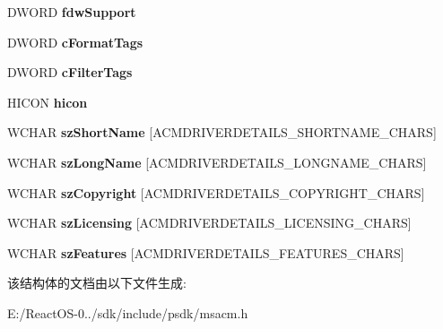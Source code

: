 \begin{DoxyCompactItemize}
\mbox{\label{struct___a_c_m_d_r_i_v_e_r_d_e_t_a_i_l_s_w_aeed15212fc48641aa25762755abd782d}} 
D\+W\+O\+RD {\bfseries fdw\+Support}
\item 
\mbox{\label{struct___a_c_m_d_r_i_v_e_r_d_e_t_a_i_l_s_w_aecf35e3010b66738f0c3a08c623d84c2}} 
D\+W\+O\+RD {\bfseries c\+Format\+Tags}
\item 
\mbox{\label{struct___a_c_m_d_r_i_v_e_r_d_e_t_a_i_l_s_w_a01c15d05af093f06e7635a5e24933dd8}} 
D\+W\+O\+RD {\bfseries c\+Filter\+Tags}
\item 
\mbox{\label{struct___a_c_m_d_r_i_v_e_r_d_e_t_a_i_l_s_w_a8a86ebe3bdfe40eef7809e89ca58902c}} 
H\+I\+C\+ON {\bfseries hicon}
\item 
\mbox{\label{struct___a_c_m_d_r_i_v_e_r_d_e_t_a_i_l_s_w_a8b8b128967f3ac22ec515b5c199ac150}} 
W\+C\+H\+AR {\bfseries sz\+Short\+Name} \mbox{[}A\+C\+M\+D\+R\+I\+V\+E\+R\+D\+E\+T\+A\+I\+L\+S\+\_\+\+S\+H\+O\+R\+T\+N\+A\+M\+E\+\_\+\+C\+H\+A\+RS\mbox{]}
\item 
\mbox{\label{struct___a_c_m_d_r_i_v_e_r_d_e_t_a_i_l_s_w_a5a1e1bc6fad72dcdc1fa964afca9a3d1}} 
W\+C\+H\+AR {\bfseries sz\+Long\+Name} \mbox{[}A\+C\+M\+D\+R\+I\+V\+E\+R\+D\+E\+T\+A\+I\+L\+S\+\_\+\+L\+O\+N\+G\+N\+A\+M\+E\+\_\+\+C\+H\+A\+RS\mbox{]}
\item 
\mbox{\label{struct___a_c_m_d_r_i_v_e_r_d_e_t_a_i_l_s_w_a59127b00b476d5b7fb9722acc5c2f44a}} 
W\+C\+H\+AR {\bfseries sz\+Copyright} \mbox{[}A\+C\+M\+D\+R\+I\+V\+E\+R\+D\+E\+T\+A\+I\+L\+S\+\_\+\+C\+O\+P\+Y\+R\+I\+G\+H\+T\+\_\+\+C\+H\+A\+RS\mbox{]}
\item 
\mbox{\label{struct___a_c_m_d_r_i_v_e_r_d_e_t_a_i_l_s_w_ab910eba9ab1b1597da18b5eb50964576}} 
W\+C\+H\+AR {\bfseries sz\+Licensing} \mbox{[}A\+C\+M\+D\+R\+I\+V\+E\+R\+D\+E\+T\+A\+I\+L\+S\+\_\+\+L\+I\+C\+E\+N\+S\+I\+N\+G\+\_\+\+C\+H\+A\+RS\mbox{]}
\item 
\mbox{\label{struct___a_c_m_d_r_i_v_e_r_d_e_t_a_i_l_s_w_ad3dff5904d8a6f4efa783fd95034a8c9}} 
W\+C\+H\+AR {\bfseries sz\+Features} \mbox{[}A\+C\+M\+D\+R\+I\+V\+E\+R\+D\+E\+T\+A\+I\+L\+S\+\_\+\+F\+E\+A\+T\+U\+R\+E\+S\+\_\+\+C\+H\+A\+RS\mbox{]}
\end{DoxyCompactItemize}


该结构体的文档由以下文件生成\+:\begin{DoxyCompactItemize}
\item 
E\+:/\+React\+O\+S-\/0../sdk/include/psdk/msacm.\+h\end{DoxyCompactItemize}
